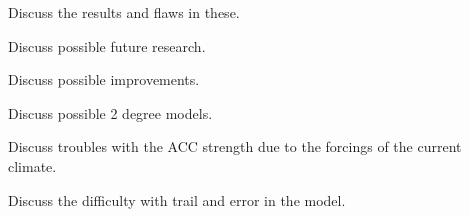 
Discuss the results and flaws in these.

Discuss possible future research.

Discuss possible improvements.

Discuss possible 2 degree models.

Discuss troubles with the ACC strength due to the forcings of the current climate.

Discuss the difficulty with trail and error in the model.

